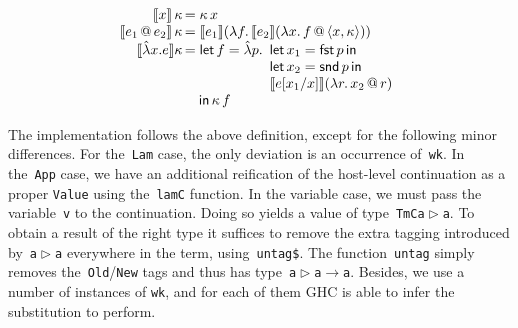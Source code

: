 \documentclass[9pt,authoryear]{sigplanconf}
\begin{document}
\[ 
\begin{array}{r@{\,}l}
 \llbracket x \rrbracket\,\kappa &= \kappa\,x \\
 \llbracket e_1 \,@\, e_2 \rrbracket\,\kappa &= \llbracket e_1 \rrbracket (\lambda f. \,
                                       \llbracket e_2 \rrbracket (\lambda x. \,
                                       f \, @ \, \langle x, \kappa \rangle ) ) \\
 \llbracket \hat\lambda x. e \rrbracket \kappa &= \mathsf{let}\, f = \hat\lambda p. \begin{array}[t]{l}
                                       \mathsf{let}\, x_1 = \mathsf{fst}\, p \,\mathsf{in}\\
                                       \mathsf{let}\, x_2  = \mathsf{snd}\, p \,\mathsf{in} \\
                                       \llbracket e[x_1/x] \rrbracket (\lambda r.\, x_2 \, @ \, r) \end{array}  \\
                                      &\quad \mathsf{in} \, \kappa\,f
\end{array} \]

%
The implementation follows the above definition, except for the
    following minor differences. For the{~}\texttt{Lam} case, the only
    deviation is an occurrence of{~}\texttt{wk}. In the{~}\texttt{App} case, we
    have an additional reification of the host-level continuation as a
    proper \texttt{Value} using the{~}\texttt{lamC} function.
    In the variable case, we must pass the variable{~}\texttt{v} to the
    continuation. Doing so yields a value of type{~}\texttt{TmC}\texttt{\mbox{\hspace{0.50em}}}\texttt{\makebox[1.22ex][l]{$ {(} $}}\texttt{a}\texttt{\mbox{\hspace{0.50em}}}\texttt{$ \vartriangleright $}\texttt{\mbox{\hspace{0.50em}}}\texttt{a}\texttt{\makebox[1.22ex][r]{$ {)} $}}.
    To obtain a result of the right type it suffices to remove the
    extra tagging introduced by{~}\texttt{a}\texttt{\mbox{\hspace{0.50em}}}\texttt{$ \vartriangleright $}\texttt{\mbox{\hspace{0.50em}}}\texttt{a} everywhere in the term,
    using{~}\texttt{\makebox[1.22ex][l]{$ {(} $}}\texttt{untag}\texttt{\mbox{\hspace{0.50em}}}\texttt{\makebox[1.22ex][c]{\textless{}}\${}\makebox[1.22ex][c]{\textgreater{}}}\texttt{\makebox[1.22ex][r]{$ {)} $}}. The function{~}\texttt{untag} simply removes
    the{~}\texttt{Old}/\texttt{New} tags and thus has type{~}\texttt{a}\texttt{\mbox{\hspace{0.50em}}}\texttt{$ \vartriangleright $}\texttt{\mbox{\hspace{0.50em}}}\texttt{a}\texttt{\mbox{\hspace{0.50em}}}\texttt{$ \rightarrow $}\texttt{\mbox{\hspace{0.50em}}}\texttt{a}. Besides,
    we use a number of instances of \texttt{wk}, and for each of them GHC is
    able to infer the substitution to perform.%
\end{document}
